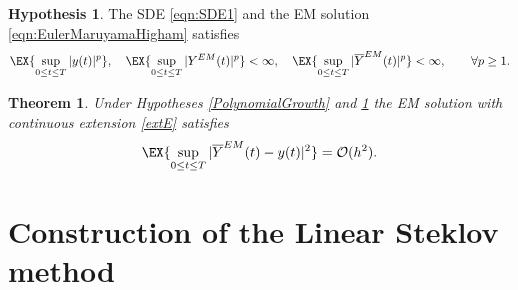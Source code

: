 \documentclass[sort&compress, preprint]{elsarticle}
\theoremstyle{definition}
\newtheorem{hypothesis}{Hypothesis}[section]
\theoremstyle{plain}%
\newtheorem{thm}{Theorem}[section]
\theoremstyle{remark}
\begin{document}
\begin{hypothesis}\label{ass:MomentBounds}
	The SDE \eqref{eqn:SDE1} and the EM solution \eqref{eqn:EulerMaruyamaHigham} satisfies
	\begin{equation*}
		\EX{
			\sup_{0\leq t\leq T}
			|y(t)|^p	
		}, \quad
	\EX{
		\sup_{0\leq t\leq T}
			|Y^{EM}(t)|^p	
	}< \infty, \quad
	\EX{
		\sup_{0\leq t\leq T}
		|\overline{Y}^{EM}(t)|^p	
	} < \infty, \qquad \forall p\geq 1.
	\end{equation*}
\end{hypothesis}
\begin{thm}
	Under Hypotheses  \ref{PolynomialGrowth} and \ref{ass:MomentBounds} the EM solution with 
	continuous extension \eqref{extE}
	satisfies
	\begin{equation}
		\EX{
			\sup_{0\leq t \leq T}
			|\overline{Y}^{EM}(t) - y(t)|^2
		} = \mathcal{O}(h^2).
	\end{equation}
\end{thm}




	\section{Construction of the Linear Steklov method}  
\end{document}
